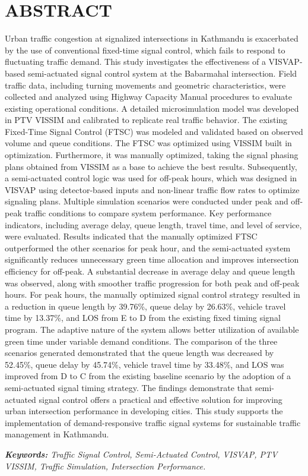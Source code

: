 

\chapter*{ABSTRACT}
{}

Urban traffic congestion at signalized intersections in Kathmandu is exacerbated by the use of conventional fixed-time signal control, which fails to 
respond to fluctuating traffic demand. This study investigates the effectiveness of a VISVAP-based semi-actuated signal control system at the Babarmahal 
intersection. Field traffic data, including turning movements and geometric characteristics, were collected and analyzed using Highway Capacity Manual 
procedures to evaluate existing operational conditions. A detailed microsimulation model was developed in PTV VISSIM and calibrated to replicate real 
traffic behavior. The existing Fixed-Time Signal Control (FTSC) was modeled and validated based on observed volume and queue conditions. The FTSC was 
optimized using VISSIM built in optimization. Furthermore, it was manually optimized, taking the signal phasing plans obtained from VISSIM as a base to
achieve the best results. Subsequently, a semi-actuated control logic was used for off-peak hours, which was designed in VISVAP using detector-based 
inputs and non-linear traffic flow rates to optimize signaling plans. Multiple simulation scenarios were conducted under peak and off-peak traffic 
conditions to compare system performance. Key performance indicators, including average delay, queue length, travel time, and level of service, were 
evaluated. Results indicated that the manually optimized FTSC outperformed the other scenarios for peak hour, and the semi-actuated system significantly 
reduces unnecessary green time allocation and improves intersection efficiency for off-peak. A substantial decrease in average delay and queue length was 
observed, along with smoother traffic progression for both peak and off-peak hours. For peak hours, the manually optimized signal control strategy resulted 
in a reduction in queue length by 39.76\%, queue delay by 26.63\%, vehicle travel time by 13.37\%, and LOS from E to D from the existing fixed timing signal program. 
The adaptive nature of the system allows better utilization of available green time under variable demand conditions. The comparison of the three scenarios generated 
demonstrated that the queue length was decreased by 52.45\%, queue delay by 45.74\%, vehicle travel time by 33.48\%, and LOS was improved from D to C from the existing baseline scenario by the adoption of a semi-actuated signal timing strategy. The findings demonstrate that semi-actuated signal control offers a practical and effective solution for 
improving urban intersection performance in developing cities. This study supports the implementation of demand-responsive traffic signal systems for sustainable traffic management in Kathmandu.

\vspace{1em}
\noindent\textit{\textbf{Keywords:} Traffic Signal Control, Semi-Actuated Control, VISVAP, PTV VISSIM, Traffic Simulation, Intersection Performance.}